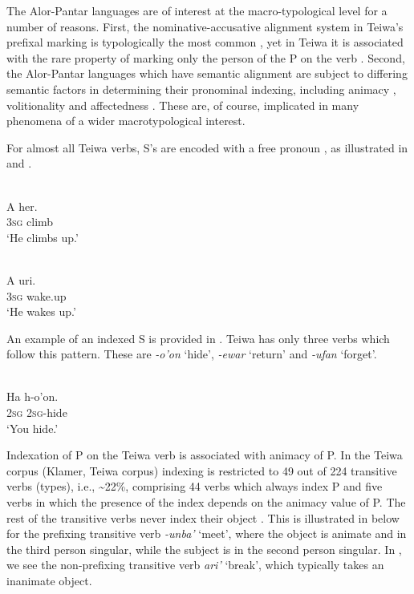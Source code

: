The Alor-Pantar languages are of interest at the macro-typological level for a number of reasons. First, the nominative-accusative alignment system in Teiwa's prefixal marking is typologically the most common \citep[53]{Siewierska2004}, yet in Teiwa it is associated with the rare property of marking only the person  of the P on the verb \citep{Siewierska2013}. Second, the Alor-Pantar languages which have semantic alignment are subject to differing semantic factors in determining their pronominal indexing, including animacy , volitionality  and affectedness . These are, of course, implicated in many phenomena of a wider macrotypological interest.

For almost all Teiwa verbs, S's are encoded with a free pronoun , as illustrated in  and .


\ea 
\label{ex:1234}
 \\
 \gll    A   her. \\
   3\textsc{sg}  climb \\
  \glt `He climbs up.'
\z



\ea%
\label{bkm:Ref383697262}
 \\
\gll       A  uri.\\  
     3\textsc{sg} wake.up \\
\glt  `He wakes up.'
\z







An example of an indexed S is provided in . Teiwa has only three verbs which follow this pattern. These are \textit{{}-o'on} `hide', \textit{{}-ewar} `return' and \textit{{}-ufan} `forget'. 


\ea%
\label{bkm:Ref357868399}
 \\
\gll      Ha   h-o'on. \\  
   2\textsc{sg} 2\textsc{sg}{}-hide   \\
\glt  `You hide.'
\z







Indexation of P on the Teiwa  verb is associated with animacy  of P. In the Teiwa corpus (Klamer, Teiwa corpus) indexing is restricted to 49 out of 224 transitive verbs (types), i.e., \~{}22\%, comprising 44 verbs which always index P and five verbs in which the presence of the index depends on the animacy value of P. The rest of the transitive verbs never index their object . This is illustrated in  below for the prefixing transitive verb \textit{{}-}\textit{unba'} `meet', where the object is animate and in the third person singular, while the subject is in the second person singular. In , we see the non-prefixing transitive verb \textit{ari'} `break', which typically takes an inanimate object.


